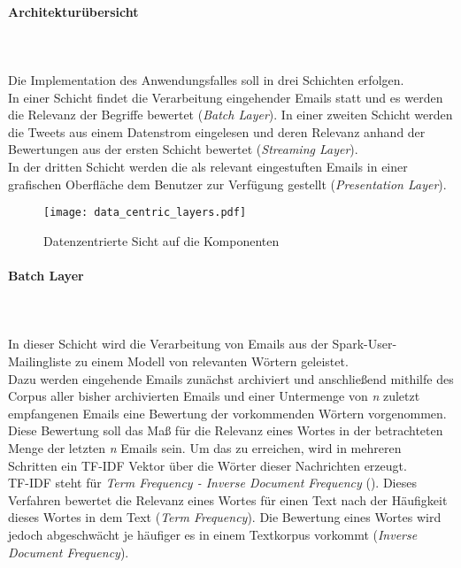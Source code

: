 \paragraph{Architekturübersicht}\\
\\

Die Implementation des Anwendungsfalles soll in drei Schichten erfolgen. \\
In einer Schicht findet die Verarbeitung eingehender Emails statt und es werden die Relevanz der Begriffe bewertet (\textit{Batch Layer}).
In einer zweiten Schicht werden die Tweets aus einem Datenstrom eingelesen und deren Relevanz anhand der Bewertungen aus der ersten Schicht bewertet (\textit{Streaming Layer}).\\
In der dritten Schicht werden die als relevant eingestuften Emails in einer grafischen Oberfläche dem Benutzer zur Verfügung gestellt (\textit{Presentation Layer}).

\begin{figure}[ht!]
	\centering
  \texttt{[image: data\_centric\_layers.pdf]}
	\caption{Datenzentrierte Sicht auf die Komponenten}
	\label{figure:data_centric_layers}
\end{figure}

\paragraph{Batch Layer}\\
\\

In dieser Schicht wird die Verarbeitung von Emails aus der Spark-User-Mailingliste zu einem Modell von relevanten Wörtern geleistet.\\

Dazu werden eingehende Emails zunächst archiviert und anschließend mithilfe des Corpus aller bisher archivierten Emails und einer Untermenge von \textit{n} zuletzt empfangenen Emails eine Bewertung der vorkommenden Wörtern vorgenommen.\\

Diese Bewertung soll das Maß für die Relevanz eines Wortes in der betrachteten Menge der letzten \textit{n} Emails sein. Um das zu erreichen, wird in mehreren Schritten ein TF-IDF Vektor über die Wörter dieser Nachrichten erzeugt.\\

TF-IDF steht für \textit{Term Frequency - Inverse Document Frequency} (\cite{SparckJones:1988:SIT:106765.106782}). Dieses Verfahren bewertet die Relevanz eines Wortes für einen Text nach der Häufigkeit dieses Wortes in dem Text (\textit{Term Frequency}). Die Bewertung eines Wortes wird jedoch abgeschwächt je häufiger es in einem Textkorpus vorkommt (\textit{Inverse Document Frequency}).\\

